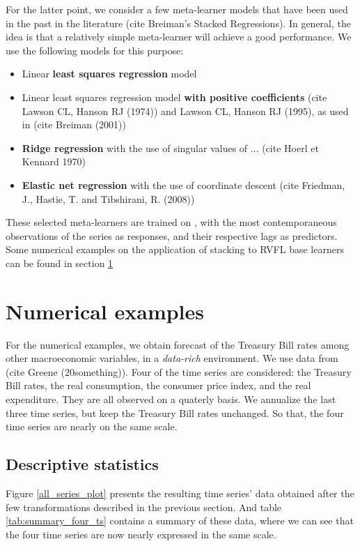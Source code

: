 For the latter point, we consider a few meta-learner models that have been used in the past in the literature (cite Breiman's Stacked Regressions). In general, the idea is that a relatively simple meta-learner will achieve a good performance. We use the following models for this purpose:
\begin{itemize}
\item Linear \textbf{least squares regression} model
\item Linear least squares regression model \textbf{with positive coefficients} (cite Lawson CL, Hanson RJ (1974)) and Lawson CL, Hanson RJ (1995), as used in (cite Breiman (2001))
\item \textbf{Ridge regression} with the use of singular values of $\ldots$ (cite Hoerl et Kennard 1970)
\item \textbf{Elastic net regression} with the use of coordinate descent (cite Friedman, J., Hastie, T. and Tibshirani, R. (2008))
\end{itemize}

These selected meta-learners are trained on , with the most contemporaneous observations of the series as responses, and their respective lags as predictors. Some numerical examples on the application of stacking to RVFL base learners can be found in section \ref{sec:numericalexamples}

\section{Numerical examples}
\label{sec:numericalexamples}

For the numerical examples, we obtain forecast of the Treasury Bill rates among other macroeconomic variables, in a \textit{data-rich} environment. We use data from (cite Greene (20something)). Four of the time series are considered: the Treasury Bill rates, the real consumption, the consumer price index, and the real expenditure. They are all observed on a quaterly basis. We annualize the last three time series, but keep the Treasury Bill rates unchanged. So that, the four time series are nearly on the same scale.


\subsection{Descriptive statistics}

Figure \ref{all_series_plot} presents the resulting time series' data obtained after the few transformations described in the previous section. And table \ref{tab:summary_four_ts} contains a summary of these data, where we can see that the four time series are now nearly expressed in the same scale. 

